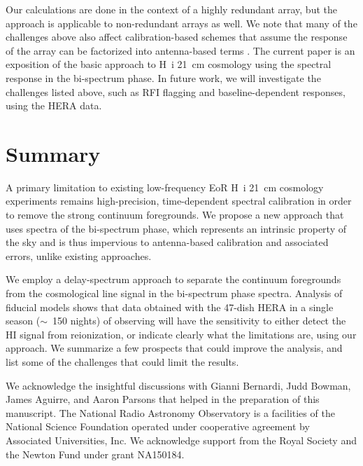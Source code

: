 \documentclass[
reprint,
superscriptaddress,
amsmath,
amssymb,
aps,
prd
]{revtex4-1}
\begin{document}
Our calculations are done in the context of a highly redundant array, but the approach is applicable to non-redundant arrays as well. We note that many of the challenges above also affect calibration-based schemes that assume the response of the array can be factorized into antenna-based terms \cite{car18}. The current paper is an exposition of the basic approach to H~{\sc i} 21~cm cosmology using the spectral response in the bi-spectrum phase. In future work, we will investigate the challenges listed above, such as RFI flagging and baseline-dependent responses, using the HERA data.

\section{Summary}\label{sec:summary}

A primary limitation to existing low-frequency EoR H~{\sc i} 21~cm cosmology experiments remains high-precision, time-dependent spectral calibration in order to remove the strong continuum foregrounds. We propose a new approach that uses spectra of the bi-spectrum phase, which represents an intrinsic property of the sky and is thus impervious to antenna-based calibration and associated errors, unlike existing approaches.
  
We employ a delay-spectrum approach to separate the continuum foregrounds from the cosmological line signal in the bi-spectrum phase spectra. Analysis of fiducial models shows that data obtained with the 47-dish HERA in a single season ($\sim$~150 nights) of observing will have the sensitivity to either detect the HI signal from reionization, or indicate clearly what the limitations are, using our approach. We summarize a few prospects that could improve the analysis, and list some of the challenges that could limit the results. 

\begin{acknowledgments}
We acknowledge the insightful discussions with Gianni Bernardi, Judd Bowman, James Aguirre, and Aaron Parsons that helped in the preparation of this manuscript. The National Radio Astronomy Observatory is a facilities of the National Science Foundation operated under cooperative agreement by Associated Universities, Inc. We acknowledge support from the Royal Society and the Newton Fund under grant NA150184.
\end{acknowledgments}

\end{document}
